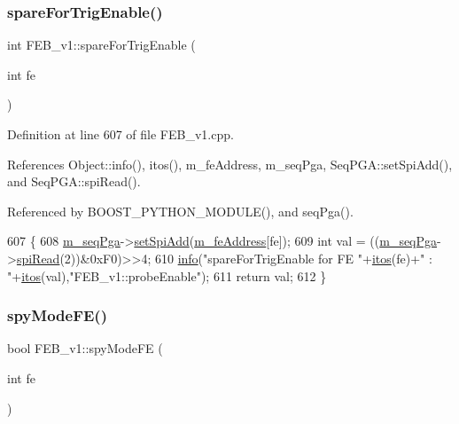 \subsubsection{\texorpdfstring{spare\+For\+Trig\+Enable()}{spareForTrigEnable()}}
{\footnotesize\ttfamily int F\+E\+B\+\_\+v1\+::spare\+For\+Trig\+Enable (\begin{DoxyParamCaption}\item[{int}]{fe }\end{DoxyParamCaption})}



Definition at line 607 of file F\+E\+B\+\_\+v1.\+cpp.



References Object\+::info(), itos(), m\+\_\+fe\+Address, m\+\_\+seq\+Pga, Seq\+P\+G\+A\+::set\+Spi\+Add(), and Seq\+P\+G\+A\+::spi\+Read().



Referenced by B\+O\+O\+S\+T\+\_\+\+P\+Y\+T\+H\+O\+N\+\_\+\+M\+O\+D\+U\+L\+E(), and seq\+Pga().


\begin{DoxyCode}
607                                     \{
608   \hyperlink{classFEB__v1_a6c7804ac86796f233a8393043adf2e77}{m\_seqPga}->\hyperlink{classSeqPGA_ac998ce3a6d9b5f2e88cc8393f8c1df53}{setSpiAdd}(\hyperlink{classFEB__v1_a4e1945c2d5b434125f375e9d0fc6d99f}{m\_feAddress}[fe]);
609   \textcolor{keywordtype}{int} val = ((\hyperlink{classFEB__v1_a6c7804ac86796f233a8393043adf2e77}{m\_seqPga}->\hyperlink{classSeqPGA_ab3d0e5e5d4014bc7a92588a76b8713d4}{spiRead}(2))&0xF0)>>4;
610   \hyperlink{classObject_a644fd329ea4cb85f54fa6846484b84a8}{info}(\textcolor{stringliteral}{"spareForTrigEnable for FE "}+\hyperlink{Tools_8h_af330027dbdafb9a30768b3613c553e60}{itos}(fe)+\textcolor{stringliteral}{" : "}+\hyperlink{Tools_8h_af330027dbdafb9a30768b3613c553e60}{itos}(val),\textcolor{stringliteral}{"FEB\_v1::probeEnable"});
611   \textcolor{keywordflow}{return} val;
612 \}
\end{DoxyCode}
\mbox{\label{classFEB__v1_a0b6d25515e575e370552c6b6f715fd76}} 
\subsubsection{\texorpdfstring{spy\+Mode\+F\+E()}{spyModeFE()}}
{\footnotesize\ttfamily bool F\+E\+B\+\_\+v1\+::spy\+Mode\+FE (\begin{DoxyParamCaption}\item[{int}]{fe }\end{DoxyParamCaption})}



